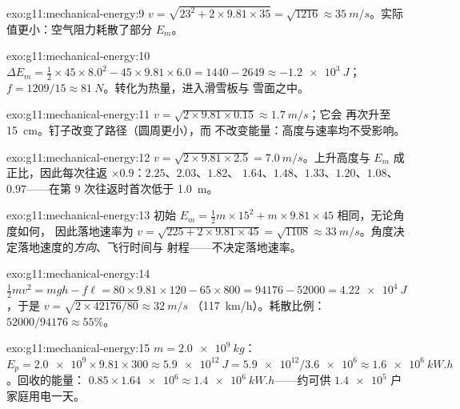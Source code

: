 \begin{solution}{exo:g11:mechanical-energy:9}
$v = \sqrt{23^2 + 2 \times 9.81 \times 35} = \sqrt{1216} \approx
\qty{35}{m/s}$。实际值更小：空气阻力耗散了部分
$E_m$。
\end{solution}

\begin{solution}{exo:g11:mechanical-energy:10}
$\Delta E_m = \tfrac12 \times 45 \times 8.0^2 - 45 \times 9.81 \times
6.0 = 1440 - 2649 \approx \qty{-1.2e3}{J}$；
$f = 1209/15 \approx \qty{81}{N}$。转化为热量，进入滑雪板与
雪面之中。
\end{solution}

\begin{solution}{exo:g11:mechanical-energy:11}
$v = \sqrt{2 \times 9.81 \times 0.15} \approx \qty{1.7}{m/s}$；它会
再次升至 \qty{15}{cm}。钉子改变了路径（圆周更小），而
不改变能量：高度与速率均不受影响。
\end{solution}

\begin{solution}{exo:g11:mechanical-energy:12}
$v = \sqrt{2 \times 9.81 \times 2.5} = \qty{7.0}{m/s}$。上升高度与
$E_m$ 成正比，因此每次往返 $\times 0.9$：$2.25$、$2.03$、$1.82$、
$1.64$、$1.48$、$1.33$、$1.20$、$1.08$、$0.97$——在第
$9$ 次往返时首次低于 \qty{1.0}{m}。
\end{solution}

\begin{solution}{exo:g11:mechanical-energy:13}
初始 $E_m = \tfrac12 m \times 15^2 + m \times 9.81 \times 45$ 相同，无论角度如何，
因此落地速率为
$v = \sqrt{225 + 2 \times 9.81 \times 45} = \sqrt{1108} \approx
\qty{33}{m/s}$。角度决定落地速度的\emph{方向}、飞行时间与
射程——不决定落地速率。
\end{solution}

\begin{solution}{exo:g11:mechanical-energy:14}
$\tfrac12 mv^2 = mgh - f\ell = 80 \times 9.81 \times 120 - 65 \times
800 = \num{94176} - \num{52000} = \qty{4.22e4}{J}$，于是
$v = \sqrt{2 \times \num{42176}/80} \approx \qty{32}{m/s}$
（\qty{117}{km/h}）。耗散比例：$52000/94176 \approx 55\%$。
\end{solution}

\begin{solution}{exo:g11:mechanical-energy:15}
$m = \qty{2.0e9}{kg}$：
$E_p = \num{2.0e9} \times 9.81 \times 300 \approx \qty{5.9e12}{J}
= \num{5.9e12}/\num{3.6e6} \approx \qty{1.6e6}{kW.h}$。回收的能量：
$0.85 \times \num{1.64e6} \approx \qty{1.4e6}{kW.h}$——约可供
$\num{1.4e5}$ 户家庭用电一天。
\end{solution}

